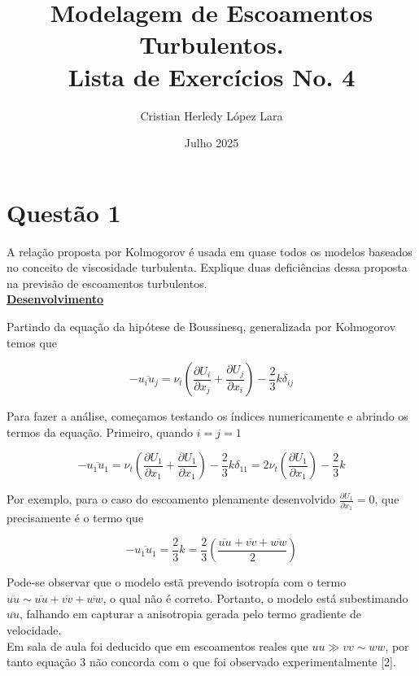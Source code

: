 \documentclass[12pt]{article}
\title{\textbf{Modelagem de Escoamentos Turbulentos. \\Lista de Exercícios No. 4}}
\author{Cristian Herledy López Lara}
\date{Julho 2025}
\begin{document}
	
\maketitle


\section*{Questão 1}

A relação proposta por Kolmogorov é usada em quase todos os modelos baseados no conceito de viscosidade turbulenta. Explique duas deficiências dessa proposta na previsão de escoamentos
turbulentos.\\


\textbf{\underline{Desenvolvimento}}

Partindo da equação da hipótese de Boussinesq, generalizada por Kolmogorov temos que 

\begin{equation}
	-\overline{u_i u_j} = \nu_t \left( \frac{\partial U_i}{\partial x_j} + \frac{\partial U_j}{\partial x_i} \right) - \frac{2}{3} k \delta_{ij}
\end{equation}


Para fazer a análise, começamos testando os índices numericamente e abrindo os termos da equação. Primeiro, quando $i=j=1$

\begin{equation}
	-\overline{u_1 u_1} = \nu_t \left( \frac{\partial U_1}{\partial x_1} + \frac{\partial U_1}{\partial x_1} \right) - \frac{2}{3} k \delta_{11} = 2\nu_t \left( \frac{\partial U_1}{\partial x_1}  \right) - \frac{2}{3} k
\end{equation}

Por exemplo, para o caso do escoamento plenamente desenvolvido $\frac{\partial U_1}{\partial x_1} = 0 $, que precisamente é o termo que 

\begin{equation}
	-\overline{u_1 u_1} = \frac{2}{3} k = \frac{2}{3}\left( \frac{\overline{uu} + \overline{vv} + \overline{ww}}{2}\right) 
\end{equation}

Pode-se observar que o modelo estã prevendo isotropía com o termo $\overline{uu} \sim  \overline{uu} + \overline{vv} + \overline{ww}$, o qual não é correto. Portanto, o modelo está subestimando $\overline{uu}$, falhando em capturar a anisotropia gerada pelo termo gradiente de velocidade.\\
Em sala de aula foi deducido que em escoamentos reales que \textbf{$uu\gg vv \sim ww$}, por tanto equação 3 não concorda com o que foi observado experimentalmente [2].\\
\end{document}
